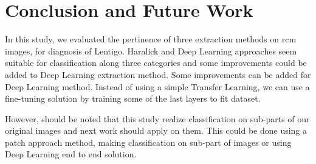 \section{Conclusion and Future Work}
\label{sec:conclusion}
In this study, we evaluated the pertinence of three extraction methods on \ac{rcm} images, for diagnosis of Lentigo. Haralick and Deep Learning approaches seem suitable for classification along three categories and some improvements could be added to Deep Learning extraction method. Some improvements can be added for Deep Learning method. Instead of using a simple Transfer Learning, we can use a fine-tuning solution by training some of the last layers to fit dataset.\par
However, should be noted that this study realize classification on sub-parts of our original images and next work should apply on them. This could be done using a patch approach method, making classification on sub-part of images or using Deep Learning end to end solution.\par